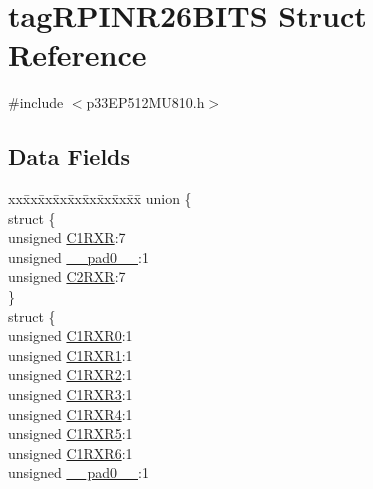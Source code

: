 \hypertarget{structtag_r_p_i_n_r26_b_i_t_s}{}\section{tag\+R\+P\+I\+N\+R26\+B\+I\+TS Struct Reference}
\label{structtag_r_p_i_n_r26_b_i_t_s}


{\ttfamily \#include $<$p33\+E\+P512\+M\+U810.\+h$>$}

\subsection*{Data Fields}
\begin{DoxyCompactItemize}
\item 
\begin{tabbing}
xx\=xx\=xx\=xx\=xx\=xx\=xx\=xx\=xx\=\kill
union \{\\
\>struct \{\\
\>\>unsigned \hyperlink{structtag_r_p_i_n_r26_b_i_t_s_a909e540cc5cda2ee8fa2a16ac4924e02}{C1RXR}:7\\
\>\>unsigned \hyperlink{structtag_r_p_i_n_r26_b_i_t_s_adf71f3d8410c1f1dbbc96680a92c49af}{\_\_pad0\_\_}:1\\
\>\>unsigned \hyperlink{structtag_r_p_i_n_r26_b_i_t_s_aa2bbf819608472f8219d983be5adb4b7}{C2RXR}:7\\
\>\} \\
\>struct \{\\
\>\>unsigned \hyperlink{structtag_r_p_i_n_r26_b_i_t_s_abfd4b33c3bfc0dee9efe229f9a078d14}{C1RXR0}:1\\
\>\>unsigned \hyperlink{structtag_r_p_i_n_r26_b_i_t_s_ad2313b12b15d491953c553d005cb9fe5}{C1RXR1}:1\\
\>\>unsigned \hyperlink{structtag_r_p_i_n_r26_b_i_t_s_a07d8a085c8fe2702a2a551db41301040}{C1RXR2}:1\\
\>\>unsigned \hyperlink{structtag_r_p_i_n_r26_b_i_t_s_af89fda5888b2d8046b9395d45b8a18d3}{C1RXR3}:1\\
\>\>unsigned \hyperlink{structtag_r_p_i_n_r26_b_i_t_s_aa385cb8eadcb5d335e277af7516c9b33}{C1RXR4}:1\\
\>\>unsigned \hyperlink{structtag_r_p_i_n_r26_b_i_t_s_a3dca524f9dec0afbe5a454c67c87eaf1}{C1RXR5}:1\\
\>\>unsigned \hyperlink{structtag_r_p_i_n_r26_b_i_t_s_aa709ce4889db71cdb7ec7df506af4a4b}{C1RXR6}:1\\
\>\>unsigned \hyperlink{structtag_r_p_i_n_r26_b_i_t_s_adf71f3d8410c1f1dbbc96680a92c49af}{\_\_pad0\_\_}:1\\

\end{tabbing}
\end{DoxyCompactItemize}
